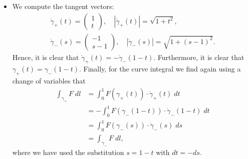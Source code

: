 \documentclass[11pt]{article}
\begin{document}
\begin{solution}
\begin{itemize}
        \item We compute the tangent vectors:
        \begin{align}
            \dot\gamma_+(t) = \begin{pmatrix} 1 \\ t \end{pmatrix}, \quad |\dot \gamma_+(t)| = \sqrt{1 + t^2},
            \\
            \dot\gamma_-(s) = \begin{pmatrix} -1 \\ s - 1 \end{pmatrix}, \quad |\dot \gamma_-(s)| = \sqrt{1 + (s-1)^2}.
        \end{align}
        Hence, it is clear that $\dot\gamma_+(t) = - \dot\gamma_-(1-t)$. Furthermore, it is clear that $\gamma_+(t) = \gamma_-(1 - t)$. Finally, for the curve integral we find again using a change of variables that
        \begin{align}
            \int_{\gamma_+} F \;dl &= \int_0^1 F(\gamma_+(t)) \cdot \dot\gamma_+(t) \;dt
            \\&
            = -\int_0^1 F(\gamma_-(1 - t)) \cdot \dot\gamma_-(1 - t) \;dt
            \\&
            = \int_0^1 F(\gamma_-(s)) \cdot \dot\gamma_-(s) \;ds
            \\&
            = \int_{\gamma_-} F \;dl,
        \end{align}
        where we have used the substitution $s = 1 - t$ with $dt = -ds$.
    \end{itemize}
\end{solution}
\end{document}
